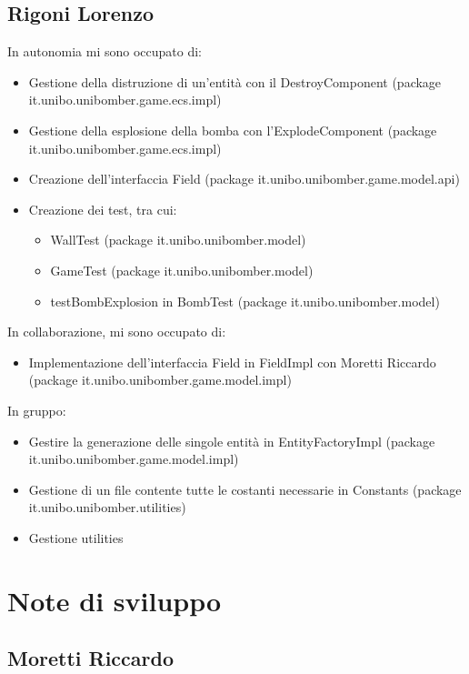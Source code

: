 \documentclass[a4paper,12pt]{report}
\begin{document}
\subsection*{Rigoni Lorenzo}
In autonomia mi sono occupato di:
\begin{itemize}
    \item Gestione della distruzione di un’entità con il DestroyComponent (package it.unibo.unibomber.game.ecs.impl)
    \item Gestione della esplosione della bomba con l’ExplodeComponent (package it.unibo.unibomber.game.ecs.impl)
    \item Creazione dell’interfaccia Field
          (package it.unibo.unibomber.game.model.api)
    \item Creazione dei test, tra cui:
          \begin{itemize}
              \item WallTest (package it.unibo.unibomber.model)
              \item GameTest (package it.unibo.unibomber.model)
              \item testBombExplosion in BombTest (package it.unibo.unibomber.model)
          \end{itemize}
\end{itemize}
In collaborazione, mi sono occupato di:
\begin{itemize}
    \item Implementazione dell’interfaccia Field in FieldImpl con Moretti Riccardo (package  it.unibo.unibomber.game.model.impl)
\end{itemize}
In gruppo:
\begin{itemize}
    \item Gestire la generazione delle singole entità in EntityFactoryImpl (package it.unibo.unibomber.game.model.impl)
    \item Gestione di un file contente tutte le costanti necessarie in Constants (package it.unibo.unibomber.utilities)
    \item Gestione utilities
\end{itemize}

\section{Note di sviluppo}
\subsection*{Moretti Riccardo}
\end{document}
